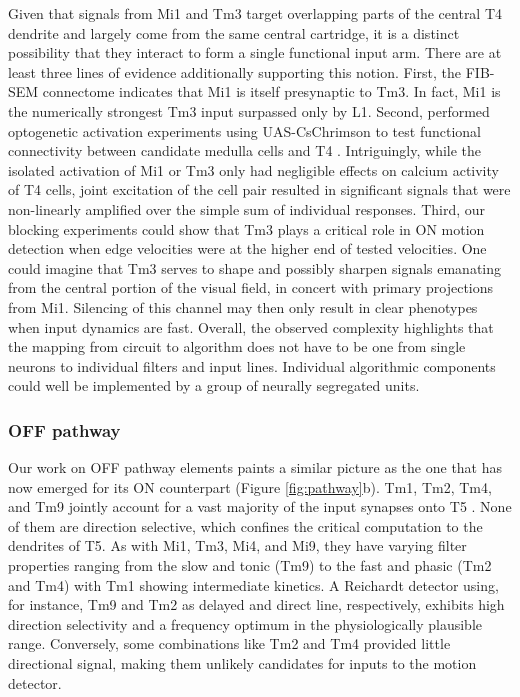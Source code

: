Given that signals from Mi1 and Tm3 target overlapping parts of the central T4 dendrite and largely come from the same central cartridge, it is a distinct possibility that they interact to form a single functional input arm. There are at least three lines of evidence additionally supporting this notion. First, the FIB-SEM connectome indicates that Mi1 is itself presynaptic to Tm3. In fact, Mi1 is the numerically strongest Tm3 input surpassed only by L1. Second, \citet{Strother:2017aa} performed optogenetic activation experiments using UAS-CsChrimson to test functional connectivity between candidate medulla cells and T4 \citep{Klapoetke:2014aa}. Intriguingly, while the isolated activation of Mi1 or Tm3 only had negligible effects on calcium activity of T4 cells, joint excitation of the cell pair resulted in significant signals that were non-linearly amplified over the simple sum of individual responses. Third, our blocking experiments could show that Tm3 plays a critical role in ON motion detection when edge velocities were at the higher end of tested velocities. One could imagine that Tm3 serves to shape and possibly sharpen signals emanating from the central portion of the visual field, in concert with primary projections from Mi1. Silencing of this channel may then only result in clear phenotypes when input dynamics are fast. Overall, the observed complexity highlights that the mapping from circuit to algorithm does not have to be one from single neurons to individual filters and input lines. Individual algorithmic components could well be implemented by a group of neurally segregated units.

\subsubsection{OFF pathway}
Our work on OFF pathway elements paints a similar picture as the one that has now emerged for its ON counterpart (Figure \ref{fig:pathway}b). Tm1, Tm2, Tm4, and Tm9 jointly account for a vast majority of the input synapses onto T5 \citep{Shinomiya:2014dx}. None of them are direction selective, which confines the critical computation to the dendrites of T5. As with Mi1, Tm3, Mi4, and Mi9, they have varying filter properties ranging from the slow and tonic (Tm9) to the fast and phasic (Tm2 and Tm4) with Tm1 showing intermediate kinetics. A Reichardt detector using, for instance, Tm9 and Tm2 as delayed and direct line, respectively, exhibits high direction selectivity and a frequency optimum in the physiologically plausible range. Conversely, some combinations like Tm2 and Tm4 provided little directional signal, making them unlikely candidates for inputs to the motion detector.

